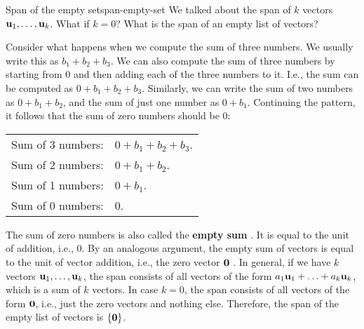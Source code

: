 \begin{example}{Span of the empty set}{span-empty-set}
  We talked about the span of $k$ vectors
  $\mbox{\bf u}_1,\ldots,\mbox{\bf u}_k$.  What if $k=0$? What is
  the span of an empty list of vectors? 
\end{example}

\begin{solution}
  Consider what happens when we compute the sum of three numbers. We
  usually write this as $b_1+b_2+b_3$. We can also compute the sum of
  three numbers by starting from $0$ and then adding each of the three
  numbers to it. I.e., the sum can be computed as
  $0+b_1+b_2+b_3$. Similarly, we can write the sum of two numbers as
  $0+b_1+b_2$, and the sum of just one number as $0+b_1$. Continuing
  the pattern, it follows that the sum of zero numbers should be $0$:
  \begin{center}
    \begin{tabular}{ll}
      Sum of 3 numbers: & $0+b_1+b_2+b_3$. \\
      Sum of 2 numbers: & $0+b_1+b_2$. \\
      Sum of 1 numbers: & $0+b_1$. \\
      Sum of 0 numbers: & $0$. \\
    \end{tabular}
  \end{center}
  The sum of zero numbers is also called the \textbf{empty sum}%
  . It is equal to the unit of addition, i.e., $0$.
  By an analogous argument, the empty sum of vectors is equal to the
  unit of vector addition, i.e., the zero vector $\mbox{\bf 0}$%
  .  In general, if we
  have $k$ vectors $\mbox{\bf u}_1,\ldots,\mbox{\bf u}_k$, the span consists
  of all vectors of the form $a_1\mbox{\bf u}_1+\ldots+a_k\mbox{\bf u}_k$,
  which is a sum of $k$ vectors.  In case $k=0$, the span consists of
  all vectors of the form $\mbox{\bf 0}$, i.e., just the zero vectors and
  nothing else. Therefore, the span of the empty list of vectors is
  $\left\{\mbox{\bf 0}\right\}$.
\end{solution}
